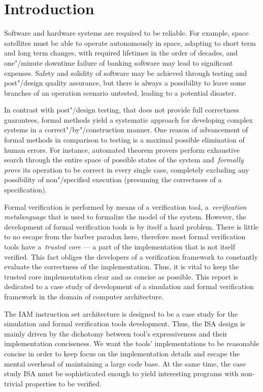 \section{Introduction}

Software and hardware systems are required to be reliable.
For example, space satellites must be able to operate autonomously in space,
adapting to short term and long term changes,
with required lifetimes in the order of decades,
and one"/minute downtime failure of banking software may lead to significant expenses.
Safety and solidity of software may be achieved through testing and post"/design quality
assurance, but there is always a possibility to leave some branches of an operation
scenario untested, leading to a potential disaster.

In contrast with post"/design testing, that does not provide full
correctness guarantees, formal methods yield a systematic approach for developing
complex systems in a correct"/by"/construction manner. One reason of advancement of
formal methods in comparison to testing is a maximal possible elimination of human errors.
For instance, automated theorem provers perform exhaustive search
through the entire space of possible states of the system and~\emph{formally prove} its
operation to be correct in every single case, completely excluding any possibility of
non"/specified execution (presuming the correctness of a specification).

Formal verification is performed by means of a verification tool,
a~\emph{verification metalanguage} that is used to formalize the model of the system.
However, the development of formal verification tools is by itself a hard problem.
There is little to no escape from the barber paradox here, therefore most formal
verification tools have a~\emph{trusted core} --- a part of the implementation that
is not itself verified. This fact obliges the developers of a verification framework
to constantly evaluate the correctness of the implementation. Thus, it is vital
to keep the trusted core implementation clear and as concise as possible. This report
is dedicated to a case study of development of a simulation and formal verification
framework in the domain of computer architecture.

The IAM instruction set architecture is designed to be a case study for
the simulation and formal verification tools development. Thus, the ISA design
is mainly driven by the dichotomy between tool's expressiveness and their
implementation conciseness.
We want the tools' implementations to be reasonable concise in order to keep
focus on the implementation details and escape the mental overhead of maintaining a large
code base. At the same time, the case study ISA must be sophisticated enough to
yield interesting programs with non-trivial properties to be verified.


